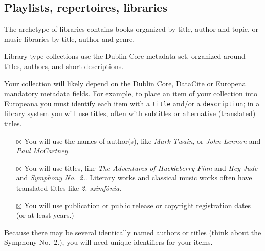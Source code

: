 \documentclass[
  letterpaper,
  DIV=11,
  numbers=noendperiod]{scrreprt}
\providecommand{\tightlist}{%
  \setlength{\itemsep}{0pt}\setlength{\parskip}{0pt}}\usepackage{longtable,booktabs,array}
\begin{document}
\subsection{Playlists, repertoires,
libraries}\label{playlists-repertoires-libraries}

The archetype of libraries contains books organized by title, author and
topic, or music libraries by title, author and genre.

Library-type collections use the Dublin Core metadata set, organized
around titles, authors, and short descriptions.

\begin{tcolorbox}[enhanced jigsaw, opacityback=0, bottomrule=.15mm, rightrule=.15mm, toptitle=1mm, breakable, colbacktitle=quarto-callout-tip-color!10!white, colback=white, title=\textcolor{quarto-callout-tip-color}{\faLightbulb}\hspace{0.5em}{Libraries, playlist}, leftrule=.75mm, toprule=.15mm, left=2mm, arc=.35mm, colframe=quarto-callout-tip-color-frame, coltitle=black, titlerule=0mm, bottomtitle=1mm, opacitybacktitle=0.6]

Your collection will likely depend on the Dublin Core, DataCite or
Europena mandatory metadata fields. For example, to place an item of
your collection into Europeana you must identify each item with a
\texttt{title} and/or a \texttt{description}; in a library system you
will use titles, often with subtitles or alternative (translated)
titles.

\begin{itemize}
\tightlist
\item[$\boxtimes$]
  You will use the names of author(s), like \emph{Mark Twain}, or
  \emph{John Lennon} and \emph{Paul McCartney}.
\item[$\boxtimes$]
  You will use titles, like \emph{The Adventures of Huckleberry Finn}
  and \emph{Hey Jude} and \emph{Symphony No.~2.}. Literary works and
  classical music works often have translated titles like \emph{2.
  szimfónia}.
\item[$\boxtimes$]
  You will use publication or public release or copyright registration
  dates (or at least years.)
\end{itemize}

Because there may be several identically named authors or titles (think
about the Symphony No.~2.), you will need unique identifiers for your
items.

\end{tcolorbox}
\end{document}
